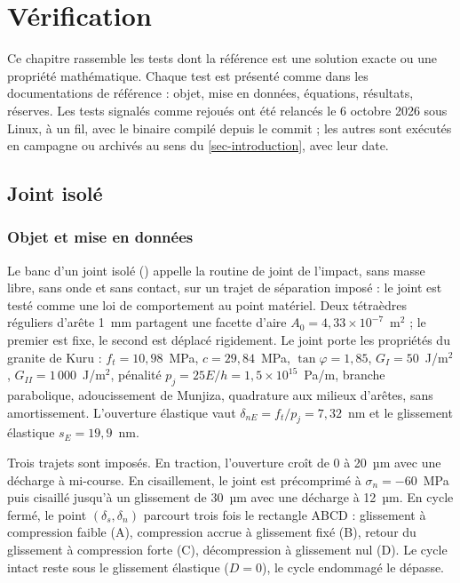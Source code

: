 \section{Vérification}
\label{sec-verification}

Ce chapitre rassemble les tests dont la référence est une solution exacte ou une propriété mathématique. Chaque test est présenté comme dans les documentations de référence : objet, mise en données, équations, résultats, réserves. Les tests signalés comme rejoués ont été relancés le 6 octobre 2026 sous Linux, à un fil, avec le binaire compilé depuis le commit  ; les autres sont exécutés en campagne ou archivés au sens du \cref{sec-introduction}, avec leur date.

\subsection{Joint isolé}
\label{sec-jointbench}

\subsubsection{Objet et mise en données}

Le banc d'un joint isolé () appelle la routine de joint de l'impact, sans masse libre, sans onde et sans contact, sur un trajet de séparation imposé : le joint est testé comme une loi de comportement au point matériel. Deux tétraèdres réguliers d'arête 1~mm partagent une facette d'aire $A_0 = 4{,}33\times10^{-7}$~m$^2$ ; le premier est fixe, le second est déplacé rigidement. Le joint porte les propriétés du granite de Kuru : $f_t = 10{,}98$~MPa, $c = 29{,}84$~MPa, $\tan\varphi = 1{,}85$, $G_I = 50$~J/m$^2$, $G_{II} = 1\,000$~J/m$^2$, pénalité $p_j = 25E/h = 1{,}5\times10^{15}$~Pa/m, branche parabolique, adoucissement de Munjiza, quadrature aux milieux d'arêtes, sans amortissement. L'ouverture élastique vaut $\delta_{nE} = f_t/p_j = 7{,}32$~nm et le glissement élastique $s_E = 19{,}9$~nm.

Trois trajets sont imposés. En traction, l'ouverture croît de 0 à 20~µm avec une décharge à mi-course. En cisaillement, le joint est précomprimé à $\sigma_n = -60$~MPa puis cisaillé jusqu'à un glissement de 30~µm avec une décharge à 12~µm. En cycle fermé, le point $(\delta_s, \delta_n)$ parcourt trois fois le rectangle ABCD : glissement à compression faible (A), compression accrue à glissement fixé (B), retour du glissement à compression forte (C), décompression à glissement nul (D). Le cycle intact reste sous le glissement élastique ($D = 0$), le cycle endommagé le dépasse.

